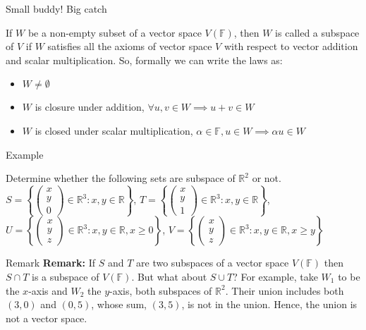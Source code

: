 \documentclass[11pt]{beamer}
\theoremstyle{plain}
\begin{document}
\begin{frame}{Small buddy! Big catch}
    \begin{definition}
    If $W$ be a non-empty subset of a vector space $V(\mathbb F)$, then $W$ is called a subspace of $V$ if $W$ satisfies all the axioms of vector space $V$ with respect to vector addition and scalar multiplication. So, formally we can write the laws as:
    \begin{itemize}
        \item $W\neq \emptyset$
        \item $W$ is closure under addition, $\forall u,v\in W\implies u+v\in W$
        \item $W$ is closed under scalar multiplication, $\alpha\in\mathbb F, u\in W\implies \alpha u\in W$
    \end{itemize}
\end{definition}
\end{frame}

\begin{frame}{Example}
    \begin{problem}
    Determine whether the following sets are subspace of $\mathbb R^2$ or not.
        $S=\left\{\begin{pmatrix}
            x\\y\\0
        \end{pmatrix}\in\mathbb R^3:x,y\in\mathbb R\right\}$,
         $T=\left\{\begin{pmatrix}
            x\\y\\1
        \end{pmatrix}\in\mathbb R^3:x,y\in\mathbb R\right\}$,
        $U=\left\{\begin{pmatrix}
            x\\y\\z
        \end{pmatrix}\in\mathbb R^3:x,y\in\mathbb R,x\geq 0\right\}$,
        $V=\left\{\begin{pmatrix}
            x\\y\\z
        \end{pmatrix}\in\mathbb R^3:x,y\in\mathbb R,x\geq y\right\}$
\end{problem}
\end{frame}

\begin{frame}{Remark}
\textbf{Remark:} If $S$ and $T$ are two subspaces of a vector space $V(\mathbb F)$ then $S\cap T$ is a subspace of $V(\mathbb F)$. But what about $S\cup T$? For example, take $W_1$ to be the $x$-axis and $W_2$ the $y$-axis, both subspaces of $\mathbb{R}^2$.    
Their union includes both $(3,0)$ and $(0,5)$, whose sum, $(3,5)$, is not in the union. Hence, the union is not a vector space.
\end{frame}
\end{document}
